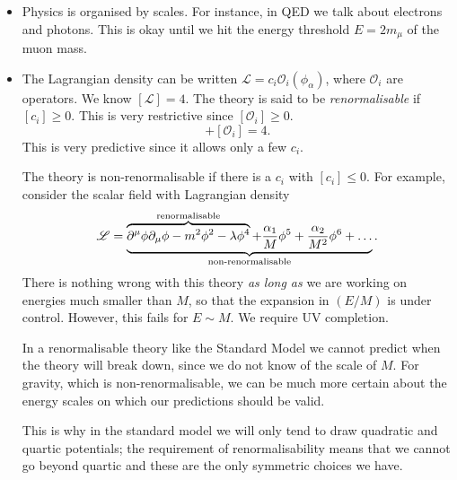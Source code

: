 \begin{enumerate}[(i)]
    \begin{itemize}
      \item Physics is organised by scales. For instance, in QED we talk about electrons and photons. This is okay until we hit the energy threshold $E = 2 m_{\mu}$ of the muon mass.
      \item The Lagrangian density can be written $\mathscr{L} = c_{i} \mathcal{O}_{i}(\phi_{\alpha})$, where $\mathcal{O}_{i}$ are operators.
	We know $[\mathscr{L}] = 4$. The theory is said to be \emph{renormalisable} if $[c_{i}] \geq 0$.
	This is very restrictive since $[\mathcal{O}_i] \geq 0$. 
	\begin{equation}
	  [c_{i}] + [\mathcal{O}_i] = 4.
	\end{equation}
	This is very predictive since it allows only a few $c_i$.

	The theory is non-renormalisable  if there is a $c_i$ with $[c_i] \leq 0$. For example, consider the scalar field with Lagrangian density
	\begin{equation}
	  \mathscr{L} = \underbrace{\overbrace{\partial^{\mu} \phi \partial_{\mu} \phi - m^2 \phi^2 -\lambda \phi^4}^{\mathclap{\text{renormalisable}}} + \frac{\alpha_1}{M} \phi^5 + \frac{\alpha_2}{M^2} \phi^6 + \dots}_{\mathclap{\text{non-renormalisable}}}.
	\end{equation}
	There is nothing wrong with this theory \emph{as long as} we are working on energies much smaller than $M$, so that the expansion in $(E / M)$ is under control.
	However, this fails for $E \sim M$. We require UV completion.

	In a renormalisable theory like the Standard Model we cannot predict when the theory will break down, since we do not know of the scale of $M$.
	For gravity, which is non-renormalisable, we can be much more certain about the energy scales on which our predictions should be valid.

	\begin{leftbar}
	  This is why in the standard model we will only tend to draw quadratic and quartic potentials; the requirement of renormalisability means that we cannot go beyond quartic and these are the only symmetric choices we have.
	\end{leftbar}
    \end{itemize}
\end{enumerate}
